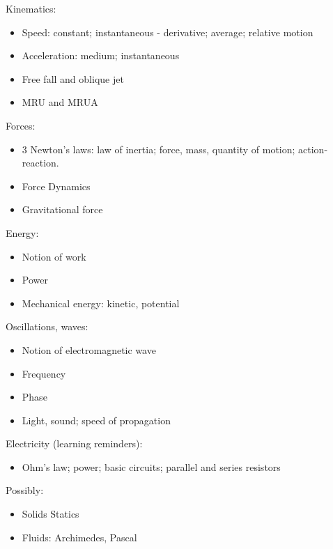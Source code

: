 Kinematics:
\begin{itemize}
    \item Speed: constant; instantaneous - derivative; average; relative motion
    \item Acceleration: medium; instantaneous
    \item Free fall and oblique jet
    \item MRU and MRUA
\end{itemize}
Forces:
\begin{itemize}
    \item 3 Newton's laws: law of inertia; force, mass, quantity of motion; action-reaction.
    \item Force Dynamics
    \item Gravitational force
\end{itemize}
Energy:
\begin{itemize}
    \item Notion of work
    \item Power
    \item Mechanical energy: kinetic, potential
\end{itemize}
Oscillations, waves:
\begin{itemize}
    \item Notion of electromagnetic wave
    \item Frequency
    \item Phase
    \item Light, sound; speed of propagation
\end{itemize}
Electricity (learning reminders):
\begin{itemize}
    \item Ohm's law; power; basic circuits; parallel and series resistors
\end{itemize}
Possibly:
\begin{itemize}
    \item Solids Statics
    \item Fluids: Archimedes, Pascal
\end{itemize}